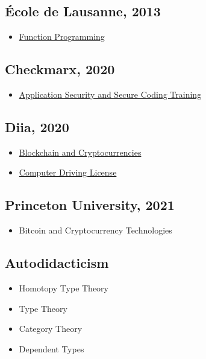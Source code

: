 \subsection*{École de Lausanne, 2013}
\begin{itemize}
  \item \href{https://tellnobody.space/cv/cert/fp.pdf}{Function Programming}
\end{itemize}

\subsection*{Checkmarx, 2020}
\begin{itemize}
  \item \href{https://tellnobody.space/cv/cert/sec.pdf}{Application Security and Secure Coding Training}
\end{itemize}

\subsection*{Diia, 2020}
\begin{itemize}
  \item \href{https://tellnobody.space/cv/cert/crypto.pdf}{Blockchain and Cryptocurrencies}
  \item \href{https://tellnobody.space/cv/cert/cdl.pdf}{Computer Driving License}
\end{itemize}

\subsection*{Princeton University, 2021}
\begin{itemize}
  \item Bitcoin and Cryptocurrency Technologies
\end{itemize}

\subsection*{Autodidacticism}
\begin{itemize}
  \item Homotopy Type Theory
  \item Type Theory
  \item Category Theory
  \item Dependent Types
\end{itemize}

